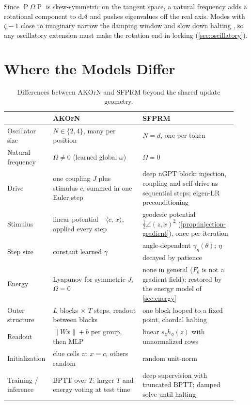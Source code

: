\documentclass{article}
\theoremstyle{plain}
\theoremstyle{definition}
\theoremstyle{remark}
\newcommand{\ip}[2]{\langle #1,\, #2\rangle}
\newcommand{\norm}[1]{\lVert #1\rVert}
\newcommand{\Proj}{\operatorname{P}}
\begin{document}
Since $\Proj\Omega\Proj$ is skew-symmetric on the tangent space, a natural frequency adds a rotational
component to $\mathrm d\mathcal A$ and pushes eigenvalues off the real axis. Modes with $\zeta-1$ close
to imaginary narrow the damping window and slow down halting \citep{sfprm}, so any oscillatory
extension must make the rotation end in locking (\cref{sec:oscillatory}).

\section{Where the Models Differ}
\label{sec:differences}

\begin{table}[t]
  \caption{Differences between AKOrN and SFPRM beyond the shared update geometry.}
  \label{tab:differences}
  \vskip 0.1in
  \begin{center}
  \begin{small}
  \begin{tabular}{@{}p{0.16\linewidth}p{0.38\linewidth}p{0.4\linewidth}@{}}
    \toprule
    & AKOrN & SFPRM \\
    \midrule
    Oscillator size & $N\in\{2,4\}$, many per position & $N=d$, one per token \\
    Natural frequency & $\Omega\neq0$ (learned global $\omega$) & $\Omega=0$ \\
    Drive & one coupling $J$ plus stimulus $c$, summed in one Euler step & deep nGPT block; injection, coupling and self-drive as sequential steps; eigen-LR preconditioning \\
    Stimulus & linear potential $-\ip{c}{x}$, applied every step & geodesic potential $\tfrac12\angle(z,x)^2$ (\cref{prop:injection-gradient}), once per iteration \\
    Step size & constant learned $\gamma$ & angle-dependent $\gamma_\eta(\theta)$; $\eta$ decayed by patience \\
    Energy & Lyapunov for symmetric $J$, $\Omega=0$ & none in general ($F_\theta$ is not a gradient field); restored by the energy model of \cref{sec:energy} \\
    Outer structure & $L$ blocks $\times$ $T$ steps, readout between blocks & one block looped to a fixed point, chordal halting \\
    Readout & $\norm{Wx}+b$ per group, then MLP & linear $s_z h_\phi(z)$ with unnormalized rows \\
    Initialization & clue cells at $x=c$, others random & random unit-norm \\
    Training / inference & BPTT over $T$; larger $T$ and energy voting at test time & deep supervision with truncated BPTT; damped solve until halting \\
    \bottomrule
  \end{tabular}
  \end{small}
  \end{center}
  \vskip -0.1in
\end{table}
\end{document}
